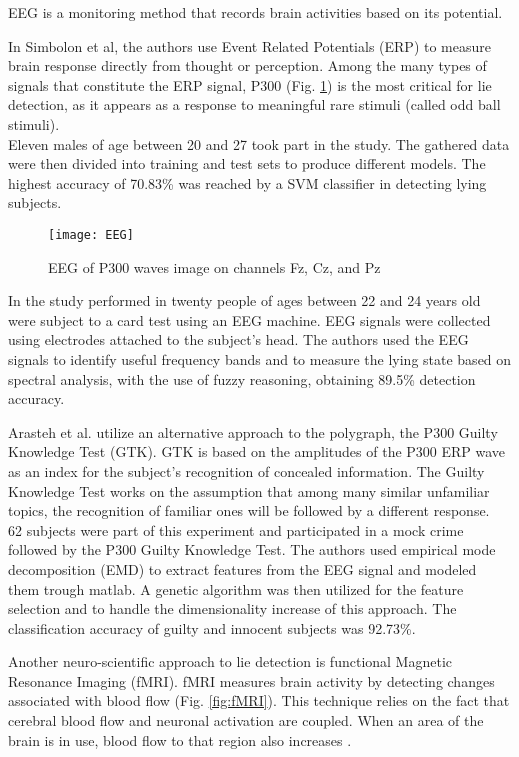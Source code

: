 EEG is a monitoring method that records brain activities based on its potential.

In \cite{7440177} Simbolon et al, the authors use Event Related Potentials (ERP) to measure brain response directly from thought or perception. Among the many types of signals that constitute the ERP signal, P300 (Fig. \ref{fig:EEG}) is the most critical for lie detection, as it appears as a response to meaningful rare stimuli (called odd ball stimuli). \\
Eleven males of age between 20 and 27 took part in the study. The gathered data were then divided into training and test sets to produce different models. The highest accuracy of 70.83\% was reached by a SVM classifier in detecting lying subjects.

\begin{figure}[H]
	\centering
	\texttt{[image: EEG]}
	\caption{EEG of P300 waves image on channels Fz, Cz, and Pz}
	\label{fig:EEG}
\end{figure}

In the study performed in \cite{Lai2017} twenty people of ages between 22 and 24 years old were subject to a card test using an EEG machine. EEG signals were collected using electrodes attached to the subject’s head. The authors used the EEG signals to identify useful frequency bands and to measure the lying state based on spectral analysis, with the use of fuzzy reasoning, obtaining 89.5\% detection accuracy.

Arasteh et al. \cite{7511728} utilize an alternative approach to the polygraph, the P300 Guilty Knowledge Test (GTK). GTK is based on the amplitudes of the P300 ERP wave as an index for the subject's recognition of concealed information. The Guilty Knowledge Test works on the assumption that among many similar unfamiliar topics, the recognition of familiar ones will be followed by a different response. \\
62 subjects were part of this experiment and participated in a mock crime followed by the P300 Guilty Knowledge Test. The authors used empirical mode decomposition (EMD) to extract features from the EEG signal and modeled them trough matlab. A genetic algorithm was then utilized for the feature selection and to handle the dimensionality increase of this approach. The classification accuracy of guilty and innocent subjects was 92.73\%.

Another neuro-scientific approach to lie detection is functional Magnetic Resonance Imaging (fMRI). fMRI measures brain activity by detecting changes associated with blood flow (Fig. \ref{fig:fMRI}). This technique relies on the fact that cerebral blood flow and neuronal activation are coupled. When an area of the brain is in use, blood flow to that region also increases \cite{WikifMRI}.

